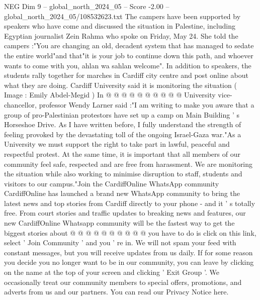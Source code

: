 \begin{textsample}{NEG Dim 9 – global\_north\_2024\_05 – Score -2.00 – global\_north\_2024\_05/108532623.txt}
The campers have been supported by speakers who have come and discussed the situation in Palestine, including Egyptian journalist Zein Rahma who spoke on Friday, May 24.
She told the campers :"You are changing an old, decadent system that has managed to sedate the entire world"and that"it is your job to continue down this path, and whoever wants to come with you, ahlan wa sahlan welcome".
In addition to speakers, the students rally together for marches in Cardiff city centre and post online about what they are doing.
Cardiff University said it is monitoring the situation ( Image : Emily Abdel-Megid ) In @ @ @ @ @ @ @ @ @ @ University vice-chancellor, professor Wendy Larner said :"I am writing to make you aware that a group of pro-Palestinian protestors have set up a camp on Main Building ' s Horseshoe Drive.
As I have written before, I fully understand the strength of feeling provoked by the devastating toll of the ongoing Israel-Gaza war."As a University we must support the right to take part in lawful, peaceful and respectful protest.
At the same time, it is important that all members of our community feel safe, respected and are free from harassment.
We are monitoring the situation while also working to minimise disruption to staff, students and visitors to our campus."Join the CardiffOnline WhatsApp community CardiffOnline has launched a brand new WhatsApp community to bring the latest news and top stories from Cardiff directly to your phone - and it ' s totally free.
From court stories and traffic updates to breaking news and features, our new CardiffOnline Whatsapp community will be the fastest way to get the biggest stories about @ @ @ @ @ @ @ @ @ @ you have to do is click on this link, select ' Join Community ' and you ' re in.
We will not spam your feed with constant messages, but you will receive updates from us daily.
If for some reason you decide you no longer want to be in our community, you can leave by clicking on the name at the top of your screen and clicking ' Exit Group '.
We occasionally treat our community members to special offers, promotions, and adverts from us and our partners.
You can read our Privacy Notice here.

\end{textsample}

